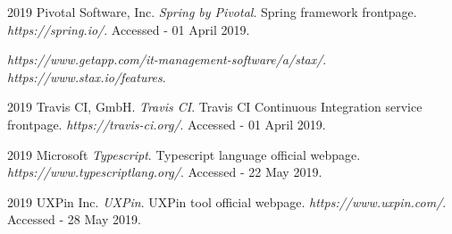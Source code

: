 \documentclass[licencjacka,en]{thesisclass}
\begin{document}
\begin{thebibliography}{99}
        2019 Pivotal Software, Inc.
        \textit{Spring by Pivotal}.
        Spring framework frontpage.
        \textit{https://spring.io/}.
        Accessed - 01 April 2019.

        \textit{https://www.getapp.com/it-management-software/a/stax/}.
        \textit{https://www.stax.io/features}.

        2019 Travis CI, GmbH.
        \textit{Travis CI}.
        Travis CI Continuous Integration service frontpage.
        \textit{https://travis-ci.org/}.
        Accessed - 01 April 2019.
        
        2019 Microsoft
        \textit{Typescript}.
        Typescript language official webpage.
        \textit{https://www.typescriptlang.org/}.
        Accessed - 22 May 2019.

        2019 UXPin Inc.
        \textit{UXPin}.
        UXPin tool official webpage.
        \textit{https://www.uxpin.com/}.
        Accessed - 28 May 2019.
        
    \end{thebibliography}
\end{document}

